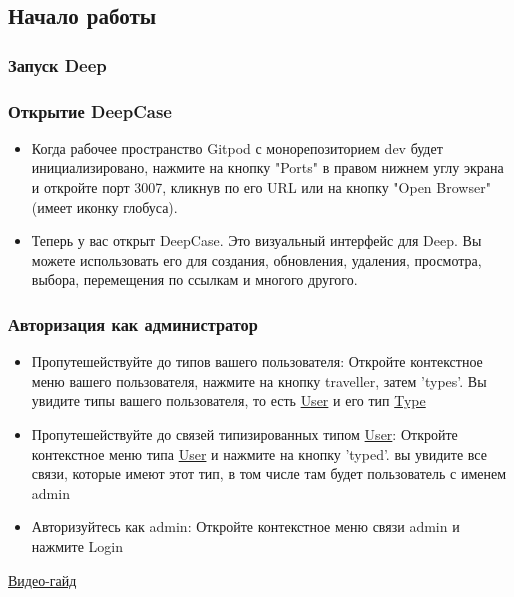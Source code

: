 \subsection{Начало работы}
\subsubsection{Запуск Deep}

\subsubsection{Открытие DeepCase}
\begin{itemize}
  \item Когда рабочее пространство Gitpod с монорепозиторием dev будет инициализировано, нажмите на кнопку "Ports" в правом нижнем углу экрана и откройте порт 3007, кликнув по его URL или на кнопку "Open Browser" (имеет иконку глобуса).
  \item Теперь у вас открыт DeepCase. Это визуальный интерфейс для Deep. Вы можете использовать его для создания, обновления, удаления, просмотра, выбора, перемещения по ссылкам и многого другого.
\end{itemize}
\subsubsection{Авторизация как администратор}
\begin{itemize}
  \item Пропутешействуйте до типов вашего пользователя: Откройте контекстное меню вашего пользователя, нажмите на кнопку traveller, затем 'types'. Вы увидите типы вашего пользователя, то есть \hyperlink{Core.User.Description}{User} и его тип \hyperlink{Core.Type.Description}{Type}
  \item Пропутешействуйте до связей типизированных типом \hyperlink{Core.User.Description}{User}: Откройте контекстное меню типа \hyperlink{Core.User.Description}{User} и нажмите на кнопку 'typed'. вы увидите все связи, которые имеют этот тип, в том числе там будет пользователь с именем admin
  \item Авторизуйтесь как admin: Откройте контекстное меню связи admin и нажмите Login
\end{itemize}
\href{https://youtu.be/6UgOiIZMYr8}{Видео-гайд}
